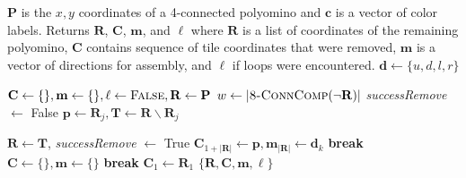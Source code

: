 \begin{algorithm}
\newcommand\algotext[1]{\end{algorithmic}#1\begin{algorithmic}[1]}
\caption{($\mathbf{P},\mathbf{c})$   \label{alg:Erode}}
$\mathbf{P}$ is the $x,y$ coordinates of a 4-connected polyomino  and $ \mathbf{c} $ is a vector of color labels.
Returns $ \mathbf{R} $, $ \mathbf{C} $, $\mathbf{m}$, and $\mathbf{\ell}$ where $ \mathbf{R} $  is a list of coordinates of the remaining polyomino, $ \mathbf{C} $ contains sequence of tile coordinates that were removed,   $\mathbf{m}$ is a vector of directions for assembly, and $\mathbf{\ell}$ if loops were encountered. $\mathbf{d} \gets\{u,d,l,r\}$
\begin{algorithmic}[1]

\State\hbox{$\mathbf{C} \leftarrow \{\}, \mathbf{m} \leftarrow \{\}, \mathbf{\ell} \gets \textrm{\sc False}, \mathbf{R} \gets \mathbf{P}$}
\State $w \gets |\text{\sc 8-ConnComp}(\neg\mathbf{R})|$ 
\State  \emph{successRemove} $\gets$ {\sc False}
\State $\mathbf{p} \gets \mathbf{R}_j,  \mathbf{T} \gets  \mathbf{R}  \backslash   \mathbf{R}_j$


\State  $\mathbf{R} \gets \mathbf{T}$,   \emph{successRemove} $\gets$ {\sc True}
\State  $\mathbf{C}_{ 1+|\mathbf{R}|} \gets \mathbf{p},  \mathbf{m}_{ |\mathbf{R}|}  \gets \mathbf{d}_k$
\EndIf
\State \textbf{break}
\EndIf
\EndFor
\EndFor
{}
\State  \hbox{$\mathbf{C} \leftarrow \{\}, \mathbf{m} \leftarrow \{\}$}
\State \textbf{break}
\EndIf
\EndFor
{}
\State  $\mathbf{C}_{ 1} \gets \mathbf{R}_1 $
\EndIf
\State \Return $\{ \mathbf{R},\mathbf{C}, \mathbf{m}, \ell \}$ 
\end{algorithmic}
\end{algorithm} 









